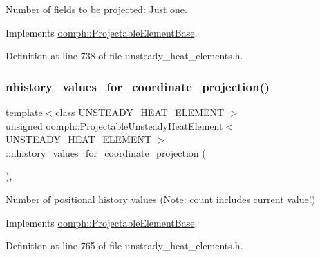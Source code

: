 Number of fields to be projected\+: Just one. 



Implements \hyperlink{classoomph_1_1ProjectableElementBase_a44634aa4049332a580d249c25564638c}{oomph\+::\+Projectable\+Element\+Base}.



Definition at line 738 of file unsteady\+\_\+heat\+\_\+elements.\+h.

\mbox{\label{classoomph_1_1ProjectableUnsteadyHeatElement_a1fcd0a7808f65c0ffde81c1e23d0e1c1}} 
\subsubsection{\texorpdfstring{nhistory\+\_\+values\+\_\+for\+\_\+coordinate\+\_\+projection()}{nhistory\_values\_for\_coordinate\_projection()}}
{\footnotesize\ttfamily template$<$class U\+N\+S\+T\+E\+A\+D\+Y\+\_\+\+H\+E\+A\+T\+\_\+\+E\+L\+E\+M\+E\+NT $>$ \\
unsigned \hyperlink{classoomph_1_1ProjectableUnsteadyHeatElement}{oomph\+::\+Projectable\+Unsteady\+Heat\+Element}$<$ U\+N\+S\+T\+E\+A\+D\+Y\+\_\+\+H\+E\+A\+T\+\_\+\+E\+L\+E\+M\+E\+NT $>$\+::nhistory\+\_\+values\+\_\+for\+\_\+coordinate\+\_\+projection (\begin{DoxyParamCaption}{ }\end{DoxyParamCaption})\hspace{0.3cm}{\ttfamily [inline]}, {\ttfamily [virtual]}}



Number of positional history values (Note\+: count includes current value!) 



Implements \hyperlink{classoomph_1_1ProjectableElementBase_ab4ecd0cd24000a3ed675dc7198203c1f}{oomph\+::\+Projectable\+Element\+Base}.



Definition at line 765 of file unsteady\+\_\+heat\+\_\+elements.\+h.




